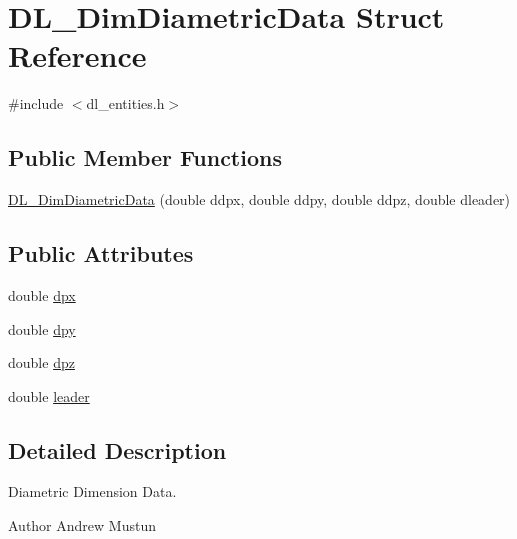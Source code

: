 \hypertarget{structDL__DimDiametricData}{\section{D\-L\-\_\-\-Dim\-Diametric\-Data Struct Reference}
\label{structDL__DimDiametricData}
}


{\ttfamily \#include $<$dl\-\_\-entities.\-h$>$}

\subsection*{Public Member Functions}
\begin{DoxyCompactItemize}
\item 
\hyperlink{structDL__DimDiametricData_a34c3b169a9b9c9e4f90eb517d9fee60c}{D\-L\-\_\-\-Dim\-Diametric\-Data} (double ddpx, double ddpy, double ddpz, double dleader)
\end{DoxyCompactItemize}
\subsection*{Public Attributes}
\begin{DoxyCompactItemize}
\item 
double \hyperlink{structDL__DimDiametricData_a8b351c11f050b026fb6035319f81e3da}{dpx}
\item 
double \hyperlink{structDL__DimDiametricData_ad782a12029f5b06fd77b53c14b590e5d}{dpy}
\item 
double \hyperlink{structDL__DimDiametricData_a4704509500b339728e75418742b8de8e}{dpz}
\item 
double \hyperlink{structDL__DimDiametricData_a0a345bb7687b44297652820934e3084b}{leader}
\end{DoxyCompactItemize}


\subsection{Detailed Description}
Diametric Dimension Data.

\begin{DoxyAuthor}{Author}
Andrew Mustun 
\end{DoxyAuthor}


